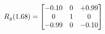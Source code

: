 \documentclass[preview]{standalone}
\begin{document}
\begin{align*}
\special{dvisvgm:raw <g id='unique000'>}R_{y}(1.68) = \begin{bmatrix}-0.10 & 0 & +0.99 \\0 & 1 & 0 \\-0.99 & 0 & -0.10\end{bmatrix}\special{dvisvgm:raw </g>}
\end{align*}
\end{document}
